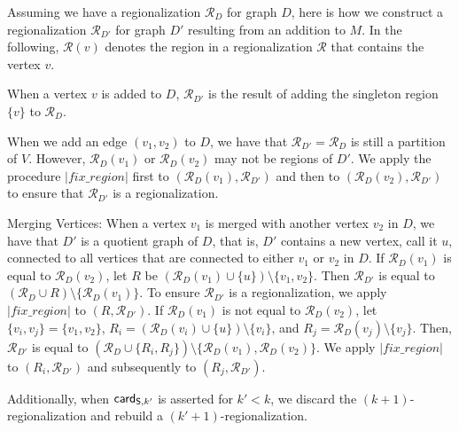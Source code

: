\documentclass{svjour3}                     %
\begin{document}
Assuming we have a regionalization $\mathcal{R}_D$ for graph $D$,
here is how we construct a regionalization $\mathcal{R}_{D'}$ 
for graph $D'$ resulting from an addition to $M$.
In the following, $\mathcal{R}(v)$ denotes the region in a regionalization $\mathcal{R}$ 
that contains the vertex $v$.

\begin{description}
\item[Adding Vertices:]
When a vertex $v$ is added to $D$, $\mathcal{R}_{D'}$ is the result of adding the singleton region $\{ v \}$ to $\mathcal{R}_D$.
\smallskip

\item[Adding Edges:]
When we add an edge $( v_1, v_2 )$ to $D$, we have that $\mathcal{R}_{D'} = \mathcal{R}_D$ is still a partition of $V$.
However, $\mathcal{R}_D( v_1 )$ or $\mathcal{R}_D( v_2 )$ may not be regions of $D'$.
We apply the procedure $|fix\_region|$ first to $( \mathcal{R}_D( v_1 ), \mathcal{R}_{D'} )$
and then to $( \mathcal{R}_D( v_2 ), \mathcal{R}_{D'} )$ to ensure that $\mathcal{R}_{D'}$ is a regionalization.
\smallskip

\item{Merging Vertices:}
When a vertex $v_1$ is merged with another vertex $v_2$ in $D$, we have that $D'$ is a quotient graph of $D$, that is,
$D'$ contains a new vertex, call it $u$, connected to all vertices that are connected to either $v_1$ or $v_2$ in $D$.
If $\mathcal{R}_D(v_1)$ is equal to $\mathcal{R}_D(v_2)$, 
let $R$ be $(\mathcal{R}_D(v_1) \cup \{ u \}) \setminus \{ v_1, v_2 \}$.
Then $\mathcal{R}_{D'}$ is equal to $(\mathcal{R}_D \cup R) \setminus \{ \mathcal{R}_D(v_1) \} $.
To ensure $\mathcal{R}_{D'}$ is a regionalization, we apply $|fix\_region|$ to $( R, \mathcal{R}_{D'} )$.
If $\mathcal{R}_D(v_1)$ is not equal to $\mathcal{R}_D(v_2)$, 
let $\{ v_i, v_j \} = \{ v_1, v_2 \}$,
$R_i = (\mathcal{R}_D(v_i) \cup \{ u \}) \setminus \{ v_i \}$, and
$R_j = \mathcal{R}_D(v_j) \setminus \{ v_j \}$.
Then, $\mathcal{R}_{D'}$ is equal to $(\mathcal{R}_D \cup \{ R_i, R_j \}) \setminus \{ \mathcal{R}_D(v_1), \mathcal{R}_D(v_2) \}$.
We apply $|fix\_region|$ to $( R_i, \mathcal{R}_{D'} )$ and subsequently to $( R_j, \mathcal{R}_{D'} )$.
\end{description}

Additionally, when $\card[\So,k']$ is asserted for $k' < k$, we discard the $(k+1)$-regionalization and rebuild a $(k'+1)$-regionalization.
\end{document}
